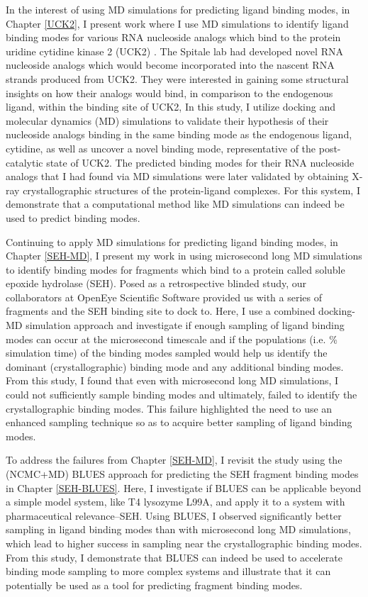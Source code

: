 In the interest of using MD simulations for predicting ligand binding modes, in Chapter \ref{UCK2}, I present work where I use MD simulations to identify ligand binding modes for various RNA nucleoside analogs which bind to the protein uridine cytidine kinase 2 (UCK2) \cite{uck2paper}.
The Spitale lab had developed novel RNA nucleoside analogs which would become incorporated into the nascent RNA strands produced from UCK2.
They were interested in gaining some structural insights on how their analogs would bind, in comparison to the endogenous ligand, within the binding site of UCK2, 
In this study, I utilize docking and molecular dynamics (MD) simulations to validate their hypothesis of their nucleoside analogs binding in the same binding mode as the endogenous ligand, cytidine, as well as uncover a novel binding mode, representative of the post-catalytic state of UCK2.
The predicted binding modes for their RNA nucleoside analogs that I had found via MD simulations were later validated by obtaining X-ray crystallographic structures of the protein-ligand complexes.
For this system, I demonstrate that a computational method like MD simulations can indeed be used to predict binding modes. 

Continuing to apply MD simulations for predicting ligand binding modes, in Chapter \ref{SEH-MD}, I present my work in using microsecond long MD simulations to identify binding modes for fragments which bind to a protein called soluble epoxide hydrolase (SEH).
Posed as a retrospective blinded study, our collaborators at OpenEye Scientific Software provided us with a series of fragments and the SEH binding site to dock to.
Here, I use a combined docking-MD simulation approach and investigate if enough sampling of ligand binding modes can occur at the microsecond timescale and if the populations (i.e. \% simulation time) of the binding modes sampled would help us identify the dominant (crystallographic) binding mode and any additional binding modes. 
From this study, I found that even with microsecond long MD simulations, I could not sufficiently sample binding modes and ultimately, failed to identify the crystallographic binding modes.
This failure highlighted the need to use an enhanced sampling technique so as to acquire better sampling of ligand binding modes.

To address the failures from Chapter \ref{SEH-MD}, I revisit the study using the (NCMC+MD) BLUES approach for predicting the SEH fragment binding modes in Chapter \ref{SEH-BLUES}.
Here, I investigate if BLUES can be applicable beyond a simple model system, like T4 lysozyme L99A, and apply it to a system with pharmaceutical relevance--SEH.
Using BLUES, I observed significantly better sampling in ligand binding modes than with microsecond long MD simulations, which lead to higher success in sampling near the crystallographic binding modes.
From this study, I demonstrate that BLUES can indeed be used to accelerate binding mode sampling to more complex systems and illustrate that it can potentially be used as a tool for predicting fragment binding modes.

